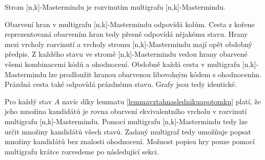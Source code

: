 \begin{veta}
    Strom [n,k]-Mastermindu je rozvinutím multigrafu [n,k]-Mastermindu.
\end{veta}
\begin{dukaz}
    Obarvení hran v multigrafu [n,k]-Mastermindu odpovídá kolům. Cesta z kořene reprezentovaná obarvením hran tedy přesně odpovídá nějakému stavu. Hrany mezi vrcholy rozvinutí a vrcholy stromu [n,k]-Mastermindu mají opět obdobný předpis. Z každého stavu ve stromě [n,k]-Mastermindu vedou hrany obarvené všemi kombinacemi kódů a ohodnocení. Obdobně každá cesta v multigrafu [n,k]-Mastermindu lze prodloužit hranou obarvenou libovolným kódem s ohodnocením. Prázdná cesta také odpovídá prázdnému stavu. Grafy jsou tedy identické. 
    



\end{dukaz}
Pro každý stav $A$ navíc díky lemmatu \ref{lemmavztahnaslednikuapotomku} platí, že jeho množina kandidátů je rovna obarvení ekvivalentního vrcholu v rozvinutí multigrafu [n,k]-Mastermindu. Pomocí multigrafu [n,k]-Mastermindu tedy lze určit množiny kandidátů všech stavů. Zadaný multigraf tedy umožňuje popsat množiny kandidátů bez znalosti ohodnocení. Možnost popisu hry pouze pomocí multigrafu krátce rozvedeme po následující sekci. 


